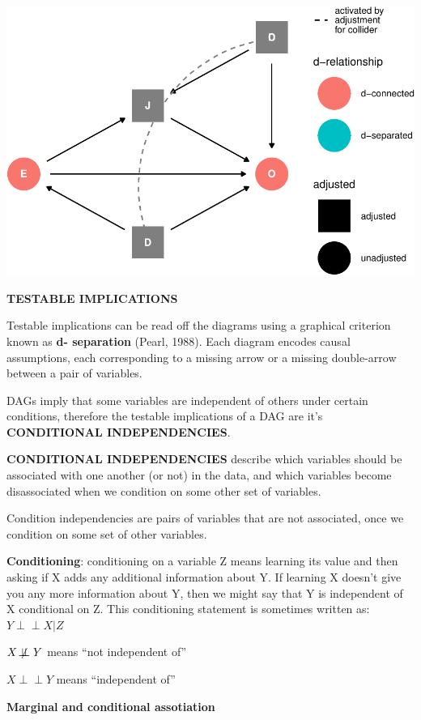 \documentclass[
]{article}
\begin{document}
\includegraphics{index_files/figure-latex/adjust JCD ex-1.pdf}

\textbf{TESTABLE IMPLICATIONS}

Testable implications can be read off the diagrams using a graphical
criterion known as \textbf{d- separation} (Pearl, 1988). Each diagram
encodes causal assumptions, each corresponding to a missing arrow or a
missing double-arrow between a pair of variables.

DAGs imply that some variables are independent of others under certain
conditions, therefore the testable implications of a DAG are it's
\textbf{CONDITIONAL INDEPENDENCIES}.

\textbf{CONDITIONAL INDEPENDENCIES} describe which variables should be
associated with one another (or not) in the data, and which variables
become disassociated when we condition on some other set of variables.

Condition independencies are pairs of variables that are not associated,
once we condition on some set of other variables.

\textbf{Conditioning}: conditioning on a variable Z means learning its
value and then asking if X adds any additional information about Y. If
learning X doesn't give you any more information about Y, then we might
say that Y is independent of X conditional on Z. This conditioning
statement is sometimes written as: \(Y \!\perp\!\!\!\perp X|Z\)

\(X \not\!\perp\!\!\!\perp Y\) means ``not independent of''

\(X \!\perp\!\!\!\perp Y\) means ``independent of''

\textbf{Marginal and conditional assotiation}
\end{document}
